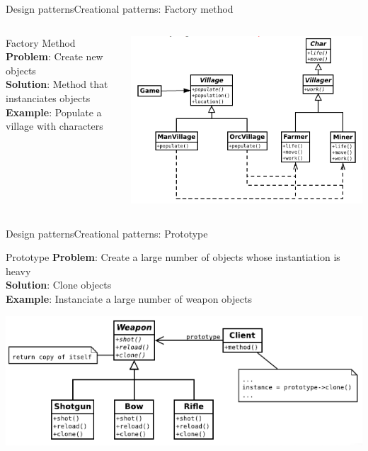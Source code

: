 \documentclass[10pt,compress]{beamer} %
\begin{document}
\begin{frame}{Design patterns}{Creational patterns: Factory method}
    \begin{columns}
	   \begin{block}{Factory Method}
			\textbf{Problem}: Create new objects\\
			\textbf{Solution}: Method that instanciates objects\\
			\textbf{Example}: Populate a village with characters\\
		\end{block}
		\centering\includegraphics[width=\linewidth]{figs/factorymethod}\\
	\end{columns}
\end{frame}

\begin{frame}{Design patterns}{Creational patterns: Prototype}
	   \begin{block}{Prototype}
			\textbf{Problem}: Create a large number of objects whose instantiation is heavy\\
			\textbf{Solution}: Clone objects\\
			\textbf{Example}: Instanciate a large number of weapon objects\\
		\end{block}
		\centering\includegraphics[width=0.9\linewidth]{figs/prototype}\\
\end{frame}
\end{document}
